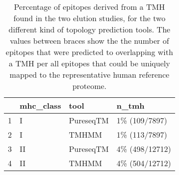 \begin{table}[ht]
\centering
\begin{tabular}{rlll}
  \hline
 & mhc\_class & tool & n\_tmh \\ 
  \hline
1 & I & PureseqTM & 1\% (109/7897) \\ 
  2 & I & TMHMM & 1\% (113/7897) \\ 
  3 & II & PureseqTM & 4\% (498/12712) \\ 
  4 & II & TMHMM & 4\% (504/12712) \\ 
   \hline
\end{tabular}
\caption{Percentage of epitopes derived from a TMH found in the two elution studies, for the two different kind of topology prediction tools. The values between braces show the the number of epitopes that were predicted to overlapping with a TMH per all epitopes that could be uniquely mapped to the representative human reference proteome.} 
\label{tab:elution}
\end{table}
